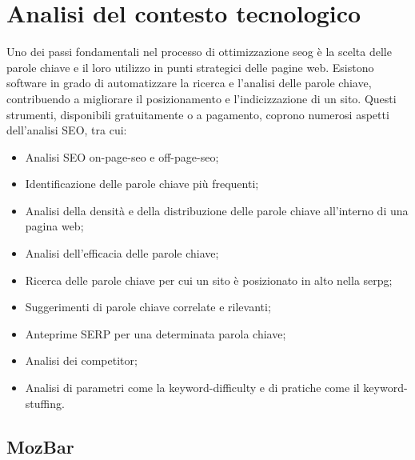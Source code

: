 \chapter{Analisi del contesto tecnologico}
\label{cap:analisi-soluzioni-esistenti}

\par Uno dei passi fondamentali nel processo di ottimizzazione \gls{seog} è la scelta delle parole chiave e il loro utilizzo in punti strategici delle pagine web. Esistono software in grado di automatizzare la ricerca e l'analisi delle parole chiave, contribuendo a migliorare il posizionamento e l'indicizzazione di un sito. Questi strumenti, disponibili gratuitamente o a pagamento, coprono numerosi aspetti dell'analisi SEO, tra cui:
\begin{itemize}
    \item Analisi SEO \gls{on-page-seo} e \gls{off-page-seo};
    \item Identificazione delle parole chiave più frequenti;
    \item Analisi della densità e della distribuzione delle parole chiave all'interno di una pagina web;
    \item Analisi dell'efficacia delle parole chiave;
    \item Ricerca delle parole chiave per cui un sito è posizionato in alto nella \gls{serpg};
    \item Suggerimenti di parole chiave correlate e rilevanti;
    \item Anteprime SERP per una determinata parola chiave;
    \item Analisi dei competitor;
    \item Analisi di parametri come la \gls{keyword-difficulty} e di pratiche come il \gls{keyword-stuffing}.
\end{itemize}

\section{MozBar}

